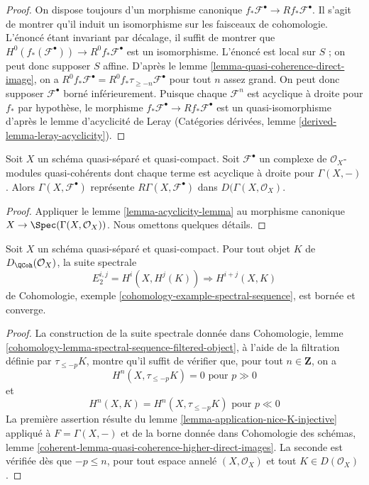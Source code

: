 \begin{proof}
On dispose toujours d'un morphisme canonique
$f_*\mathcal{F}^\bullet \to Rf_*\mathcal{F}^\bullet$.
Il s'agit de montrer qu'il induit un isomorphisme sur les faisceaux de cohomologie.
L'énoncé étant invariant par décalage, il suffit de montrer que
$H^0(f_*(\mathcal{F}^\bullet)) \to R^0f_*\mathcal{F}^\bullet$
est un isomorphisme. L'énoncé est local sur $S$ ; on peut donc
supposer $S$ affine. D'après
le lemme \ref{lemma-quasi-coherence-direct-image},
on a $R^0f_*\mathcal{F}^\bullet = R^0f_*\tau_{\geq -n}\mathcal{F}^\bullet$
pour tout $n$ assez grand. On peut donc supposer $\mathcal{F}^\bullet$
borné inférieurement. Puisque chaque $\mathcal{F}^n$ est acyclique à droite pour $f_*$ par
hypothèse, le morphisme $f_*\mathcal{F}^\bullet \to Rf_*\mathcal{F}^\bullet$
est un quasi-isomorphisme d'après le lemme d'acyclicité de Leray (Catégories dérivées, lemme
\ref{derived-lemma-leray-acyclicity}).
\end{proof}

\begin{lemma}
\label{lemma-acyclicity-lemma-global}
Soit $X$ un schéma quasi-séparé et quasi-compact.
Soit $\mathcal{F}^\bullet$ un complexe de
$\mathcal{O}_X$-modules quasi-cohérents dont chaque terme est acyclique à droite pour $\Gamma(X, -)$.
Alors $\Gamma(X, \mathcal{F}^\bullet)$ représente
$R\Gamma(X, \mathcal{F}^\bullet)$ dans $D(\Gamma(X, \mathcal{O}_X)$.
\end{lemma}

\begin{proof}
Appliquer le lemme \ref{lemma-acyclicity-lemma} au morphisme canonique
$X \to \Spec(\Gamma(X, \mathcal{O}_X))$. Nous omettons quelques détails.
\end{proof}

\begin{lemma}
\label{lemma-spectral-sequence}
Soit $X$ un schéma quasi-séparé et quasi-compact. Pour tout objet
$K$ de $D_\QCoh(\mathcal{O}_X)$, la suite spectrale
$$
E_2^{i, j} = H^i(X, H^j(K)) \Rightarrow H^{i + j}(X, K)
$$
de Cohomologie, exemple \ref{cohomology-example-spectral-sequence},
est bornée et converge.
\end{lemma}

\begin{proof}
La construction de la suite spectrale donnée dans
Cohomologie, lemme \ref{cohomology-lemma-spectral-sequence-filtered-object},
à l'aide de la filtration définie par $\tau_{\leq -p}K$, montre qu'il
suffit de vérifier que, pour tout $n \in \mathbf{Z}$, on a
$$
H^n(X, \tau_{\leq -p}K) = 0 \text{ pour } p \gg 0
$$
et
$$
H^n(X, K) = H^n(X, \tau_{\leq -p}K) \text{ pour } p \ll 0
$$
La première assertion résulte du lemme \ref{lemma-application-nice-K-injective}
appliqué à $F = \Gamma(X, -)$ et de la borne donnée dans
Cohomologie des schémas, lemme
\ref{coherent-lemma-quasi-coherence-higher-direct-images}.
La seconde est vérifiée dès que
$-p \leq n$, pour tout espace annelé $(X, \mathcal{O}_X)$ et tout
$K \in D(\mathcal{O}_X)$.
\end{proof}

